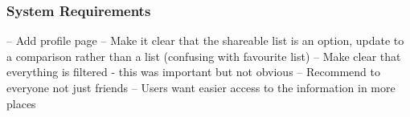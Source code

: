 \documentclass[a4 paper, 12pt]{article}
\begin{document}
        



            
              
   




    \subsubsection*{System Requirements}


        -- Add profile page
        -- Make it clear that the shareable list is an option, update to a comparison rather than a list (confusing with favourite list)
        -- Make clear that everything is filtered - this was important but not obvious
        -- Recommend to everyone not just friends
        -- Users want easier access to the information in more places
\end{document}
